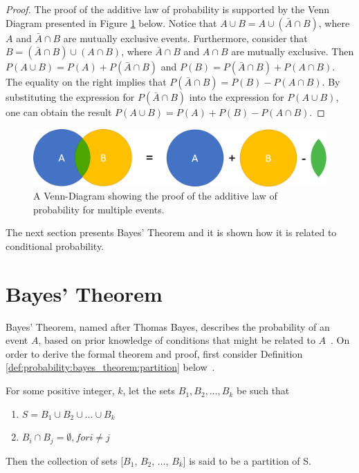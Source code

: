 \begin{proof}
      The proof of the additive law of probability is supported by the Venn Diagram presented in Figure \ref{fig:probability:multiple_events:additive} below. Notice that $A \cup B = A \cup ( \bar{A} \cap B)$, where $A$ and $\bar{A} \cap B$ are mutually exclusive events. Furthermore, consider that $B = (\bar{A} \cap B) \cup (A \cap B)$, where $\bar{A} \cap B$ and $A \cap B$ are mutually exclusive. Then $P(A \cup B) = P(A) + P(\bar{A} \cap B)$ and $P(B) = P(\bar{A} \cap B) + P(A \cap B)$. The equality on the right implies that $P(\bar{A} \cap B) = P(B) - P(A \cap B)$. By substituting the expression for $P(\bar{A} \cap B)$ into the expression for $P(A \cup B)$, one can obtain the result $P(A \cup B) = P(A) + P(B) - P(A \cap B)$.
\end{proof}

\begin{figure}[htbp]
      \includegraphics[width=\textwidth]{images/additive_law_of_probability_proof.png}
      \caption{A Venn-Diagram showing the proof of the additive law of probability for multiple events.}
      \label{fig:probability:multiple_events:additive}
\end{figure}

The next section presents Bayes' Theorem and it is shown how it is related to conditional probability.

\section{Bayes' Theorem}
\label{sec:probability:bayes_theorem}

Bayes' Theorem, named after Thomas Bayes, describes the probability of an event $A$, based on prior knowledge of conditions that might be related to $A$~\cite{ref:zalta:2015}. On order to derive the formal theorem and proof, first consider Definition \ref{def:probability:bayes_theorem:partition} below~\cite{ref:zalta:2015}.

\begin{definition}
      \label{def:probability:bayes_theorem:partition}
      For some positive integer, $k$, let the sets $B_{1}, B_{2}, \dots, B_{k}$ be such that

      \begin{enumerate}
            \item $S = B_{1} \cup B_{2} \cup \dots \cup B_{k}$
            \item $B_{i} \cap B_{j} = \emptyset, for i \neq j$
      \end{enumerate}

      Then the collection of sets [$B_{1}$, $B_{2}$, $\dots$, $B_{k}$] is said to be a partition of S.
\end{definition}

